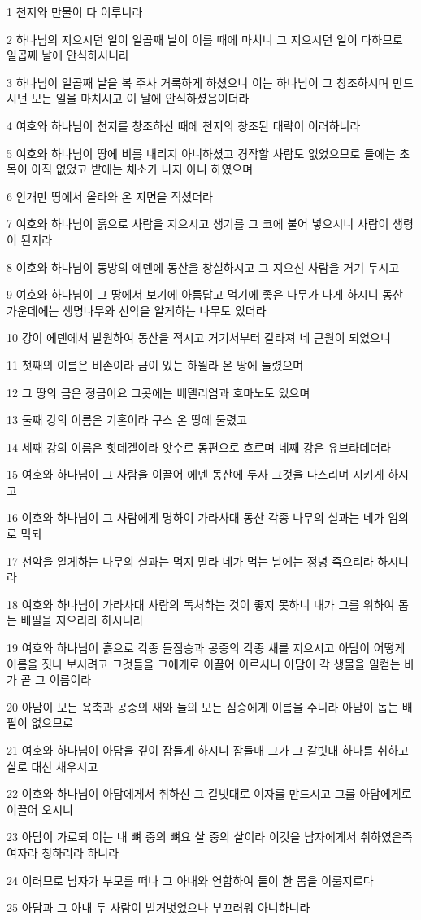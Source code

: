 \par 1 천지와 만물이 다 이루니라
\par 2 하나님의 지으시던 일이 일곱째 날이 이를 때에 마치니 그 지으시던 일이 다하므로 일곱째 날에 안식하시니라
\par 3 하나님이 일곱째 날을 복 주사 거룩하게 하셨으니 이는 하나님이 그 창조하시며 만드시던 모든 일을 마치시고 이 날에 안식하셨음이더라
\par 4 여호와 하나님이 천지를 창조하신 때에 천지의 창조된 대략이 이러하니라
\par 5 여호와 하나님이 땅에 비를 내리지 아니하셨고 경작할 사람도 없었으므로 들에는 초목이 아직 없었고 밭에는 채소가 나지 아니 하였으며
\par 6 안개만 땅에서 올라와 온 지면을 적셨더라
\par 7 여호와 하나님이 흙으로 사람을 지으시고 생기를 그 코에 불어 넣으시니 사람이 생령이 된지라
\par 8 여호와 하나님이 동방의 에덴에 동산을 창설하시고 그 지으신 사람을 거기 두시고
\par 9 여호와 하나님이 그 땅에서 보기에 아름답고 먹기에 좋은 나무가 나게 하시니 동산 가운데에는 생명나무와 선악을 알게하는 나무도 있더라
\par 10 강이 에덴에서 발원하여 동산을 적시고 거기서부터 갈라져 네 근원이 되었으니
\par 11 첫째의 이름은 비손이라 금이 있는 하윌라 온 땅에 둘렸으며
\par 12 그 땅의 금은 정금이요 그곳에는 베델리엄과 호마노도 있으며
\par 13 둘째 강의 이름은 기혼이라 구스 온 땅에 둘렸고
\par 14 세째 강의 이름은 힛데겔이라 앗수르 동편으로 흐르며 네째 강은 유브라데더라
\par 15 여호와 하나님이 그 사람을 이끌어 에덴 동산에 두사 그것을 다스리며 지키게 하시고
\par 16 여호와 하나님이 그 사람에게 명하여 가라사대 동산 각종 나무의 실과는 네가 임의로 먹되
\par 17 선악을 알게하는 나무의 실과는 먹지 말라 네가 먹는 날에는 정녕 죽으리라 하시니라
\par 18 여호와 하나님이 가라사대 사람의 독처하는 것이 좋지 못하니 내가 그를 위하여 돕는 배필을 지으리라 하시니라
\par 19 여호와 하나님이 흙으로 각종 들짐승과 공중의 각종 새를 지으시고 아담이 어떻게 이름을 짓나 보시려고 그것들을 그에게로 이끌어 이르시니 아담이 각 생물을 일컫는 바가 곧 그 이름이라
\par 20 아담이 모든 육축과 공중의 새와 들의 모든 짐승에게 이름을 주니라 아담이 돕는 배필이 없으므로
\par 21 여호와 하나님이 아담을 깊이 잠들게 하시니 잠들매 그가 그 갈빗대 하나를 취하고 살로 대신 채우시고
\par 22 여호와 하나님이 아담에게서 취하신 그 갈빗대로 여자를 만드시고 그를 아담에게로 이끌어 오시니
\par 23 아담이 가로되 이는 내 뼈 중의 뼈요 살 중의 살이라 이것을 남자에게서 취하였은즉 여자라 칭하리라 하니라
\par 24 이러므로 남자가 부모를 떠나 그 아내와 연합하여 둘이 한 몸을 이룰지로다
\par 25 아담과 그 아내 두 사람이 벌거벗었으나 부끄러워 아니하니라

